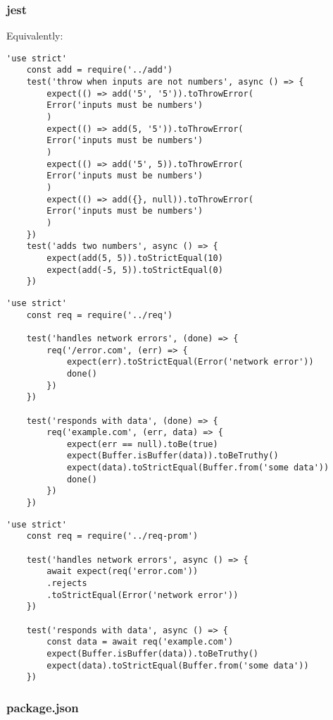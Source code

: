\documentclass{scrartcl}
\begin{document}
\subsubsection{jest}

Equivalently:

\begin{lstlisting}[style=ES6]
    'use strict'
    const add = require('../add')
    test('throw when inputs are not numbers', async () => {
        expect(() => add('5', '5')).toThrowError(
        Error('inputs must be numbers')
        )
        expect(() => add(5, '5')).toThrowError(
        Error('inputs must be numbers')
        )
        expect(() => add('5', 5)).toThrowError(
        Error('inputs must be numbers')
        )
        expect(() => add({}, null)).toThrowError(
        Error('inputs must be numbers')
        )
    })
    test('adds two numbers', async () => {
        expect(add(5, 5)).toStrictEqual(10)
        expect(add(-5, 5)).toStrictEqual(0)
    })
\end{lstlisting}

\begin{lstlisting}[style=ES6]
    'use strict'
    const req = require('../req')

    test('handles network errors', (done) => {
        req('/error.com', (err) => {
            expect(err).toStrictEqual(Error('network error'))
            done()
        })
    })

    test('responds with data', (done) => {
        req('example.com', (err, data) => {
            expect(err == null).toBe(true)
            expect(Buffer.isBuffer(data)).toBeTruthy()
            expect(data).toStrictEqual(Buffer.from('some data'))
            done()
        })
    })
\end{lstlisting}

\begin{lstlisting}[style=ES6]
    'use strict'
    const req = require('../req-prom')

    test('handles network errors', async () => {
        await expect(req('error.com'))
        .rejects
        .toStrictEqual(Error('network error'))
    })

    test('responds with data', async () => {
        const data = await req('example.com')
        expect(Buffer.isBuffer(data)).toBeTruthy()
        expect(data).toStrictEqual(Buffer.from('some data'))
    })
\end{lstlisting}

\subsubsection{package.json}
\end{document}
